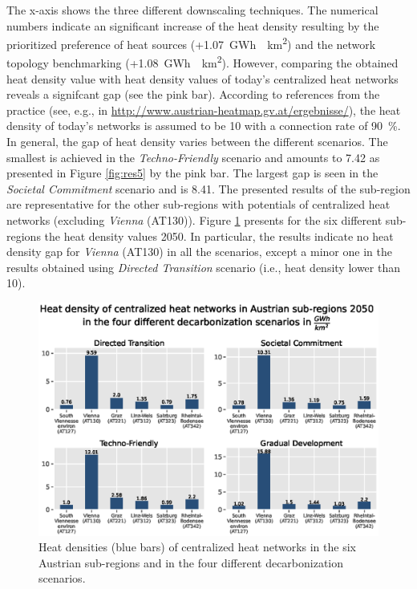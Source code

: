 The x-axis shows the three different downscaling techniques. The numerical numbers indicate an significant increase of the heat density resulting by the prioritized preference of heat sources (+\SI{1.07}{GWh \per km^2}) and the network topology benchmarking (+\SI{1.08}{GWh \per km^2}). However, comparing the obtained heat density value with heat density values of today's centralized heat networks reveals a signifcant gap (see the pink bar). According to references from the practice (see, e.g., in \url{http://www.austrian-heatmap.gv.at/ergebnisse/}), the heat density of today's networks is assumed to be \SI{10}{} with a connection rate of \SI{90}{\%}. In general, the gap of heat density varies between the different scenarios. The smallest is achieved in the \textit{Techno-Friendly} scenario and amounts to \SI{7.42}{} as presented in Figure \ref{fig:res5} by the pink bar. The largest gap is seen in the \textit{Societal Commitment} scenario and is \SI{8.41}{}. The presented results of the sub-region are representative for the other sub-regions with potentials of centralized heat networks (excluding \textit{Vienna} (AT130)). Figure \ref{fig:res4} presents for the six different sub-regions the heat density values 2050. In particular, the results indicate no heat density gap for \textit{Vienna} (AT130) in all the scenarios, except a minor one in the results obtained using \textit{Directed Transition} scenario (i.e., heat density lower than \SI{10}{}).  



\begin{figure}[h]
	\centering
	\includegraphics[width=1\linewidth]{figures/4_Results/Fig_Gap/HD1.eps}
	\caption{Heat densities (blue bars) of centralized heat networks in the six Austrian sub-regions and in the four different decarbonization scenarios.}
	\label{fig:res4}
\end{figure}